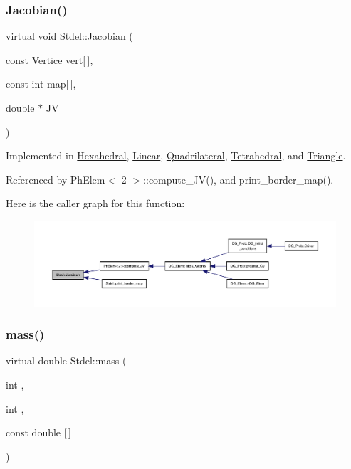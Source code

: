 \subsubsection{\texorpdfstring{Jacobian()}{Jacobian()}}
{\footnotesize\ttfamily virtual void Stdel\+::\+Jacobian (\begin{DoxyParamCaption}\item[{const \hyperlink{structVertice}{Vertice}}]{vert\mbox{[}$\,$\mbox{]},  }\item[{const int}]{map\mbox{[}$\,$\mbox{]},  }\item[{double $\ast$}]{JV }\end{DoxyParamCaption})\hspace{0.3cm}{\ttfamily [pure virtual]}}



Implemented in \hyperlink{classHexahedral_aa12d6d2abce9f0c7f6065e907be71201}{Hexahedral}, \hyperlink{classLinear_ab1e68626dc6eaf9cbd6432e7adcb3721}{Linear}, \hyperlink{classQuadrilateral_af35d0775bd010cf4987925a035b1ec35}{Quadrilateral}, \hyperlink{classTetrahedral_abe0c60a6df85f832c81876468fe39c2e}{Tetrahedral}, and \hyperlink{classTriangle_a723405bf07d4123a417623114409b74e}{Triangle}.



Referenced by Ph\+Elem$<$ 2 $>$\+::compute\+\_\+\+J\+V(), and print\+\_\+border\+\_\+map().

Here is the caller graph for this function\+:
\nopagebreak
\begin{figure}[H]
\begin{center}
\leavevmode
\includegraphics[width=350pt]{classStdel_a953ff994c1bb423245aff079932c648f_icgraph}
\end{center}
\end{figure}
\mbox{\label{classStdel_ab475cc8bc82a3b8a5200d4d841ef0a51}} 
\subsubsection{\texorpdfstring{mass()}{mass()}}
{\footnotesize\ttfamily virtual double Stdel\+::mass (\begin{DoxyParamCaption}\item[{int}]{,  }\item[{int}]{,  }\item[{const double}]{\mbox{[}$\,$\mbox{]} }\end{DoxyParamCaption})\hspace{0.3cm}{\ttfamily [pure virtual]}}



